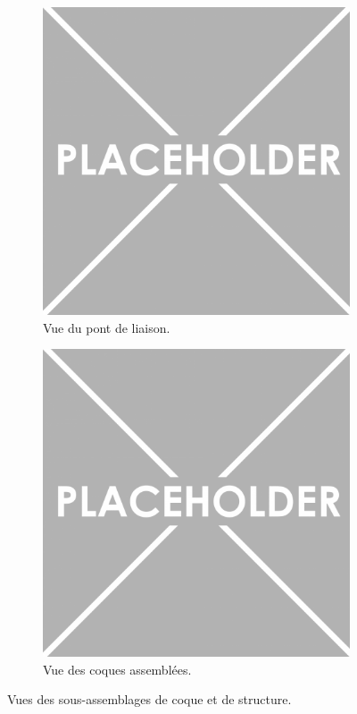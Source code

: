 {\begin{figure}[!htpb]
    \centering
    \begin{subfigure}{0.45\textwidth}
        \centering
        \includegraphics[width=\textwidth]{Figures/PezizaTuberosa.jpg}
        \caption{Vue du pont de liaison.}
        \label{fig:cross-deck}
    \end{subfigure}
    \hspace{.5cm}
    \begin{subfigure}{0.45\textwidth}
        \centering
        \includegraphics[width=\textwidth]{Figures/PezizaTuberosa.jpg}
        \caption{Vue des coques assemblées.}
        \label{fig:hull-assembly}
    \end{subfigure}
    \caption{Vues des sous-assemblages de coque et de structure.}
    \label{fig:coque-structure}
\end{figure}

}
